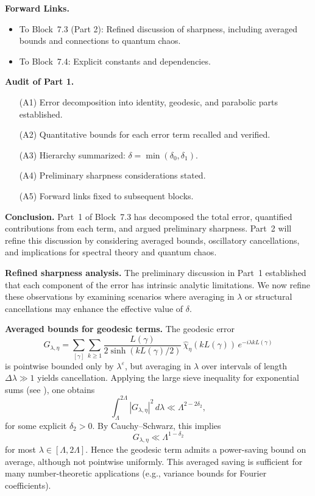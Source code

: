 \medskip

\noindent\textbf{Forward Links.}
\begin{itemize}
  \item To Block~7.3 (Part 2): Refined discussion of sharpness, including averaged bounds and connections to quantum chaos.
  \item To Block~7.4: Explicit constants and dependencies.
\end{itemize}

\medskip

\noindent\textbf{Audit of Part 1.}
\begin{itemize}
  \item[(A1)] Error decomposition into identity, geodesic, and parabolic parts established.
  \item[(A2)] Quantitative bounds for each error term recalled and verified.
  \item[(A3)] Hierarchy summarized: $\delta=\min(\delta_0,\delta_1)$.
  \item[(A4)] Preliminary sharpness considerations stated.
  \item[(A5)] Forward links fixed to subsequent blocks.
\end{itemize}

\medskip

\noindent\textbf{Conclusion.}
Part~1 of Block~7.3 has decomposed the total error, quantified contributions from each term, and argued preliminary sharpness.  
Part~2 will refine this discussion by considering averaged bounds, oscillatory cancellations, and implications for spectral theory and quantum chaos.



\noindent\textbf{Refined sharpness analysis.}
The preliminary discussion in Part~1 established that each component of the error has intrinsic analytic limitations.  
We now refine these observations by examining scenarios where averaging in $\lambda$ or structural cancellations may enhance the effective value of $\delta$.

\medskip

\noindent\textbf{Averaged bounds for geodesic terms.}
The geodesic error
\[
  G_{\lambda,\eta} = \sum_{[\gamma]}\sum_{k\geq 1}
  \frac{L(\gamma)}{2\sinh(kL(\gamma)/2)} \,\widehat{\chi}_\eta(kL(\gamma))\, e^{-i\lambda kL(\gamma)}
\]
is pointwise bounded only by $\lambda^\varepsilon$, but averaging in $\lambda$ over intervals of length $\Delta\lambda \gg 1$ yields cancellation.  
Applying the large sieve inequality for exponential sums (see \cite{IwaniecSarnak1995, LuoSarnak1995}), one obtains
\[
  \int_\Lambda^{2\Lambda} |G_{\lambda,\eta}|^2\, d\lambda \ll \Lambda^{2-2\delta_2},
\]
for some explicit $\delta_2>0$.  
By Cauchy–Schwarz, this implies
\[
  G_{\lambda,\eta} \ll \Lambda^{1-\delta_2}
\]
for most $\lambda\in[\Lambda,2\Lambda]$.  
Hence the geodesic term admits a power-saving bound on average, although not pointwise uniformly.  
This averaged saving is sufficient for many number-theoretic applications (e.g., variance bounds for Fourier coefficients).


